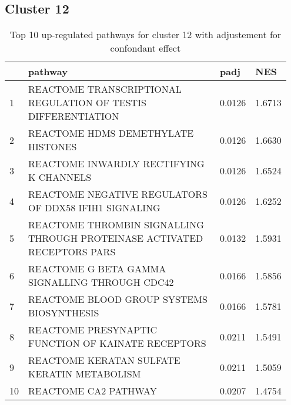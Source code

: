 \documentclass{article}
\begin{document}
\subsection{Cluster 12 }
\begin{table}[H]
\centering
\begin{tabular}{p{0.05\linewidth}p{0.7\linewidth}p{0.1\linewidth}p{0.1\linewidth}}
  \hline
 & pathway & padj & NES \\ 
  \hline
1 & REACTOME TRANSCRIPTIONAL REGULATION OF TESTIS DIFFERENTIATION & 0.0126 & 1.6713 \\ 
  2 & REACTOME HDMS DEMETHYLATE HISTONES & 0.0126 & 1.6630 \\ 
  3 & REACTOME INWARDLY RECTIFYING K CHANNELS & 0.0126 & 1.6524 \\ 
  4 & REACTOME NEGATIVE REGULATORS OF DDX58 IFIH1 SIGNALING & 0.0126 & 1.6252 \\ 
  5 & REACTOME THROMBIN SIGNALLING THROUGH PROTEINASE ACTIVATED RECEPTORS PARS & 0.0132 & 1.5931 \\ 
  6 & REACTOME G BETA GAMMA SIGNALLING THROUGH CDC42 & 0.0166 & 1.5856 \\ 
  7 & REACTOME BLOOD GROUP SYSTEMS BIOSYNTHESIS & 0.0166 & 1.5781 \\ 
  8 & REACTOME PRESYNAPTIC FUNCTION OF KAINATE RECEPTORS & 0.0211 & 1.5491 \\ 
  9 & REACTOME KERATAN SULFATE KERATIN METABOLISM & 0.0211 & 1.5059 \\ 
  10 & REACTOME CA2 PATHWAY & 0.0207 & 1.4754 \\ 
   \hline
\end{tabular}
\caption{Top 10 up-regulated pathways for cluster 12 with adjustement for confondant effect} 
\label{tab:q3_2_conf_12}
\end{table}
\end{document}
